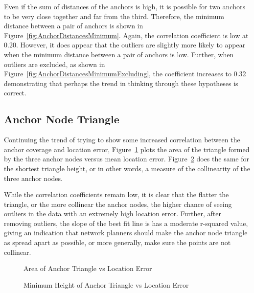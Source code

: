 Even if the sum of distances of the anchors is high, it is possible for two anchors to be very close together and far from the third.  Therefore, the minimum distance between a pair of anchors is shown in Figure~\ref{fig:AnchorDistancesMinimum}.  Again, the correlation coefficient is low at 0.20.  However, it does appear that the outliers are slightly more likely to appear when the minimum distance between a pair of anchors is low.  Further, when outliers are excluded, as shown in Figure~\ref{fig:AnchorDistancesMinimumExcluding}, the coefficient increases to 0.32 demonstrating that perhaps the trend in thinking through these hypotheses is correct.

\subsection{Anchor Node Triangle}
\label{sec:anchorTriangle}
Continuing the trend of trying to show some increased correlation between the anchor coverage and location error, Figure~\ref{fig:AnchorArea} plots the area of the triangle formed by the three anchor nodes versus mean location error. Figure~\ref{fig:AnchorHeight} does the same for the shortest triangle height, or in other words, a measure of the collinearity of the three anchor nodes.

While the correlation coefficients remain low, it is clear that the flatter the triangle, or the more collinear the anchor nodes, the higher chance of seeing outliers in the data with an extremely high location error. Further, after removing outliers, the slope of the best fit line is has a moderate r-squared value, giving an indication that network planners should make the anchor node triangle as spread apart as possible, or more generally, make sure the points are not collinear.

\begin{figure}
  \centering
	\caption{Area of Anchor Triangle vs Location Error}	    
	\label{fig:AnchorArea}
\end{figure}

\begin{figure}
  \centering
	\caption{Minimum Height of Anchor Triangle vs Location Error}	    
	\label{fig:AnchorHeight}
\end{figure}
